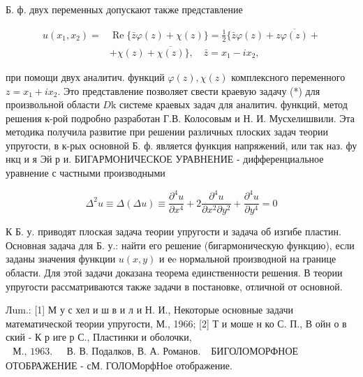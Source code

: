 \documentclass[10pt]{article}
\begin{document}
Б. ф. двух переменных допускают также представление



\[

\begin{aligned}

u\left(x_{1}, x_{2}\right)= & \operatorname{Re}\{\bar{z} \varphi(z)+\chi(z)\}=\frac{1}{2}\{\bar{z} \varphi(z)+z \overline{\varphi(z)}+ \\

& +\chi(z)+\overline{\chi(z)}\}, \quad \bar{z}=x_{1}-i x_{2},

\end{aligned}

\]



при помощи двух аналитич. функций $\varphi(z), \chi(z)$ комплексного переменного $z=x_{1}+i x_{2}$. Это представление позволяет свести краевую задачу (*) для произвольной области $D \mathrm{k}$ системе краевых задач для аналитич. функций, метод решения к-рой подробно разработан Г.В. Колосовым и Н. И. Мусхелишвили. Эта методика получила развитие при решении различных плоских задач теории упругости, в к-рых основной Б. ф. является функция напряжений, или так наз. фу нкц и я Эй р и. БИГАРМОНИЧЕСКОЕ УРАВНЕНИЕ - дифференциальное уравнение с частными производными



\[

\Delta^{2} u \equiv \Delta(\Delta u) \equiv \frac{\partial^{4} u}{\partial x^{4}}+2 \frac{\partial^{4} u}{\partial x^{2} \partial y^{2}}+\frac{\partial^{4} u}{\partial y^{4}}=0

\]



К Б. у. приводят плоская задача теории упругости и задача об изгибе пластин. Основная задача для Б. у.: найти его решение (бигармоническую функцию), если заданы значения функции $u(x, y)$ и еe нормальной производной на границе области. Для этой задачи доказана теорема единственности решения. В теории упругости рассматриваются также задачи в постановке, отличной от основной.



Лum.: [1] М у с хел и ш в и л и Н. И., Некоторые основные задачи математической теории упругости, М., 1966; [2] Т и моше н ко С. П., В ойн о в ский - К р иге р С., Пластинки и оболочки, $\begin{array}{ll}\text { М., 1963. } & \text { В. В. Подалков, В. А. Романов. }\end{array}$ БИГОЛОМОРФНОЕ ОТОБРАЖЕНИЕ - сМ. ГОЛОМорфНое отображение.
\end{document}
